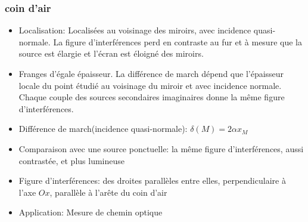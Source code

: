 \documentclass[a4paper,12pt]{book}
\begin{document}
\subsubsection{coin d'air}
\begin{itemize}
    \item Localisation: Localisées au voisinage des miroirs, avec incidence quasi-normale. La figure d'interférences perd en contraste 
          au fur et à mesure que la source est élargie et l'écran est éloigné des miroirs.
    \item Franges d'égale épaisseur. La différence de march dépend que l'épaisseur locale du point étudié au voisinage du miroir et avec incidence 
          normale. Chaque couple des sources secondaires imaginaires donne la même figure d'interférences.
    \item Différence de march(incidence quasi-normale): $\delta(M)=2\alpha x_M$
    \item Comparaison avec une source ponctuelle: la même figure d'interférences, aussi contrastée, et plus lumineuse
    \item Figure d'interférences: des droites parallèles entre elles, perpendiculaire à l'axe $Ox$, parallèle à l'arête du coin d'air
    \item Application: Mesure de chemin optique
\end{itemize}
\end{document}
